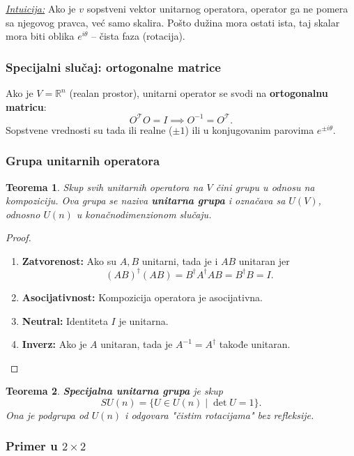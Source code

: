 \documentclass[a4paper,12pt,twoside]{report}
\newtheorem{theorem}{Teorema}[section]
\numberwithin{algorithm}{section}
\begin{document}
\noindent\underline{\textit{Intuicija:}} Ako je $v$ sopstveni vektor unitarnog operatora, operator ga ne pomera sa njegovog pravca, već samo skalira. Pošto dužina mora ostati ista, taj skalar mora biti oblika $e^{i\theta}$ – čista faza (rotacija).

\subsubsection{Specijalni slučaj: ortogonalne matrice}

Ako je $V = \mathbb{R}^n$ (realan prostor), unitarni operator se svodi na \textbf{ortogonalnu matricu}:
\[
    O^\mathcal{T} O = I \implies O^{-1} = O^\mathcal{T}.
\]
Sopstvene vrednosti su tada ili realne ($\pm 1$) ili u konjugovanim parovima $e^{\pm i\theta}$.

\subsubsection{Grupa unitarnih operatora}

\begin{theorem}
    Skup svih unitarnih operatora na $V$ čini grupu u odnosu na kompoziciju. Ova grupa se naziva \textbf{unitarna grupa} i označava sa $U(V)$, odnosno $U(n)$ u konačnodimenzionom slučaju.
\end{theorem}
\begin{proof}
    \begin{enumerate}
        \item \textbf{Zatvorenost:} Ako su $A, B$ unitarni, tada je i $AB$ unitaran jer
        \[
            (AB)^\dagger (AB) = B^\dagger A^\dagger A B = B^\dagger B = I.
        \]
        \item \textbf{Asocijativnost:} Kompozicija operatora je asocijativna.
        \item \textbf{Neutral:} Identiteta $I$ je unitarna.
        \item \textbf{Inverz:} Ako je $A$ unitaran, tada je $A^{-1} = A^\dagger$ takođe unitaran.
    \end{enumerate}
\end{proof}

\begin{theorem}
    \textbf{Specijalna unitarna grupa} je skup
    \[
        SU(n) = \{ U \in U(n) \mid \det U = 1 \}.
    \]
    Ona je podgrupa od $U(n)$ i odgovara "čistim rotacijama" bez refleksije.
\end{theorem}

\subsubsection{Primer u $2 \times 2$}
\end{document}
